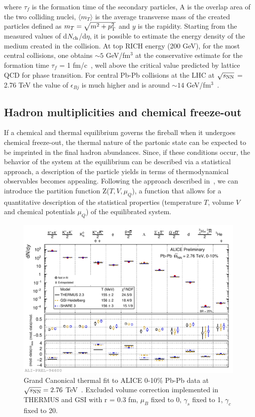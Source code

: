 where $\tau_f$ is the formation time of the secondary particles, A is the overlap area of the two colliding nuclei, $\langle m_T \rangle$ is the average transverse mass of the created particles defined as $m_{T} = \sqrt{m^{2}+p_{\rm T}^2}$ and $y$ is the rapidity. Starting from the measured values of d$N_{\rm ch}$/d$\eta$, it is possible to estimate the energy density of the medium created in the collision.
At top RICH energy (200 GeV), for the most central collisions, one obtains $\sim 5$ GeV/fm$^3$ at the conservative estimate for the formation time $\tau_f$ = 1 fm/c~\cite{Bjorken:1982qr}, well above the critical value predicted by lattice QCD for phase transition. For central Pb-Pb collisions at the LHC at $\sqrt{s_{\rm NN}}$ = 2.76 TeV the value of $\epsilon_{Bj}$ is much higher and is around $\sim 14$ GeV/fm$^3$~\cite{Chatrchyan:2012mb}.

\subsection{Hadron multiplicities and chemical freeze-out}
If a chemical and thermal equilibrium governs the fireball when it undergoes chemical freeze-out, the thermal nature of the partonic state can be expected to be imprinted in the final hadron abundances. Since, if these conditions occur, the behavior of the system at the equilibrium can be described via a statistical approach, a description of the particle yields in terms of thermodynamical observables becomes appealing. Following the approach described in~\cite{BraunMunzinger:2003zd}, we can introduce the partition function Z($T,V,\mu_{Q}$), a function that allows for a quantitative description of the statistical properties (temperature $T$, volume $V$ and chemical potentials $\mu_{Q}$) of the equilibrated system.
\begin{figure}[!ht]
  \centering
  \includegraphics[width=12cm]{FigCap1/GCThermalFit_PbPb010.pdf}
  \caption{Grand Canonical thermal fit to ALICE 0-10\% Pb-Pb data at $\sqrt{s_{\rm NN}} = 2.76$ TeV~\cite{Floris:2014pta}. Excluded volume correction implemented in THERMUS and GSI with r = 0.3 fm, $\mu_{B}$ fixed to 0, $\gamma_{s}$ fixed to 1, $\gamma_{c}$ fixed to 20. }
  \label{fig:GCThermalFit_PbPb010}
\end{figure}

